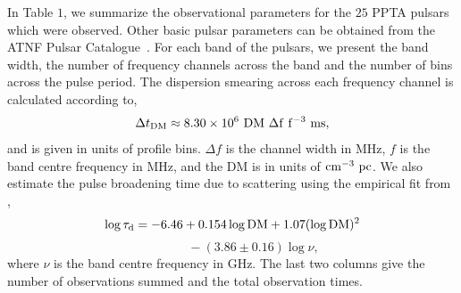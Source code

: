 \documentclass[useAMS,usenatbib]{mn2e}
\begin{document}
In Table $1$, we summarize the observational parameters for the $25$ PPTA pulsars 
which were observed. Other basic pulsar parameters can be obtained from the ATNF 
Pulsar Catalogue~\citep{Manchester05}.
%
For each band of the pulsars, we present the band width, the number of frequency channels
across the band and the number of bins across the pulse period.
%
The dispersion smearing across each frequency channel is calculated according to, 
%
\begin{equation}
\Delta t_{\rm{DM}}\approx 8.30 \times 10^{6}\ \rm{DM}\ \Delta f\ f^{-3}\ \rm{ms},
\end{equation}
%
and is given in units of profile bins. $\Delta f$ is the channel width in MHz, $f$ is 
the band centre frequency in MHz, and the DM is in units of $\rm{cm^{-3}\ pc}$.
%
We also estimate the pulse broadening time due to scattering using the empirical fit 
from \citet{Bhat04}, 
%
\[
\log \tau_{\rm{d}} = -6.46+0.154\log\rm{DM}+1.07(\log\rm{DM})^2
\]
%
\begin{equation}
\qquad\quad\ \ -(3.86\pm0.16)\log\nu,
\end{equation}
where $\nu$ is the band centre frequency in GHz.
%
The last two columns give the number of observations summed and the total observation 
times.
\end{document}
